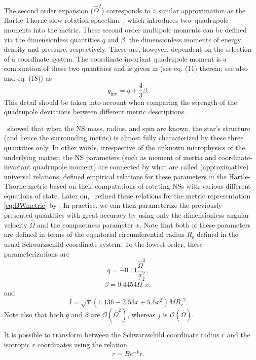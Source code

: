 \documentclass{aa}
\newcommand{\be}{\begin{equation}}
\newcommand{\ee}{\end{equation}}
\newcommand{\refe}[1]{#1}
\newcommand{\refedel}[1]{}
\newcommand{\Req}{\ensuremath{R_{\mathrm{e}}}}
\newcommand{\sch}{Schwarzschild }
\newcommand{\rb}{\ensuremath{\bar{r}}}
\newcommand{\Ob}{\ensuremath{\hat{\Omega}}}
\newcommand{\nub}{\ensuremath{\bar{\nu}}}
\newcommand{\Bb}{\ensuremath{\bar{B}}}
\newcommand{\qinv}{\ensuremath{q_{\mathrm{inv}}}}
\begin{document}
The second order expansion ($\Ob^2$) corresponds to a similar approximation as the Hartle-Thorne slow-rotation spacetime \citep{HT68}, which introduces \refe{two} quadrupole moments into the metric.  
These second order multipole moments can be defined via the dimensionless quantities $q$ and $\beta$, the dimensionless moments of energy density and pressure, respectively.
\refe{These are, however, dependent on the selection of a coordinate system.}
The coordinate invariant quadrupole moment\refedel{, on the other hand,} is a combination of these two \refedel{factors}\refe{quantities} and is given in \citet{PA12} \refe{(see eq. (11) therein; see also \citealt{aGM14} and eq. (18))} as
\be
\qinv =  q + \frac{4}{3} \beta.
\ee
\refe{This detail should be taken into account when comparing the strength of the quadrupole deviations between different metric descriptions.}


\citet{YY13} showed that when the NS mass, radius, and spin are known, the star's structure (and hence the surrounding metric) is almost fully characterized by these three quantities only. %
In other words, irrespective of the unknown microphysics of the underlying matter, the NS parameters \refe{(such as moment of inertia and coordinate-invariant quadrupole moment)} are \refe{connected} by what are called (approximative) universal relations.
\citet{BBP13} defined empirical relations for these parameters in the Hartle-Thorne metric based on their computations of rotating NSs with various different equations of state.
Later on, \citet{aGM14} refined these relations for the metric representation \eqref{eq:BWmetric} by \citet{BI76}.
In practice, we can then parameterize the previously presented quantities with great accuracy by using only the dimensionless angular velocity $\Ob$ and the compactness \refe{parameter} $x$.
Note that both of these parameters are defined \refe{in terms of} the equatorial circumferential radius $\Req$ defined in the usual \sch coordinate system.
To the lowest order, these parameterizations are \citep{aGM14}
\be\label{eq:quad}
q = -0.11 \frac{\Ob^2}{x^2},
\ee
\be\label{eq:beta}
\beta = 0.4454 \Ob^2 x,
\ee
and
\be\label{eq:I}
I = \sqrt{x} (1.136 - 2.53 x + 5.6 x^2) M \Req^2.
\ee
Note also that both $q$ and $\beta$ are $\mathcal{O}(\Ob^2)$, \refe{whereas} $j$ is $\mathcal{O}(\Ob)$.
    
It is possible to transform between the \refe{\sch coordinate radius} $r$ and the isotropic $\rb$ coordinates using the relation \citep{FIP86}
\be\label{eq:rb2r}
r = \Bb e^{-\nub} \rb.
\ee
\end{document}
